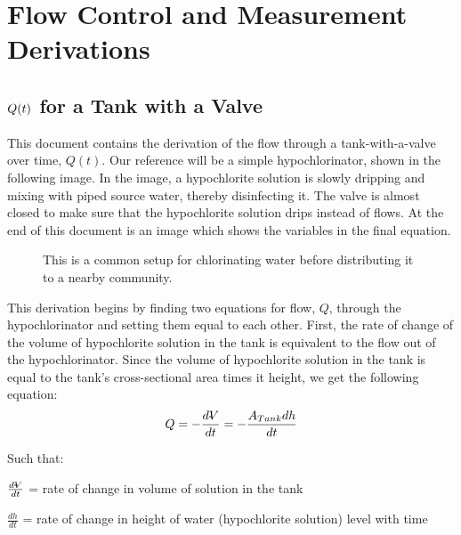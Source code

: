 \documentclass[letterpaper,10pt,english]{sphinxmanual}
\let\sphinxpxdimen\pdfpxdimen\else\newdimen\sphinxpxdimen
\begin{document}
\chapter{Flow Control and Measurement Derivations}
\label{\detokenize{Flow_Control_and_Measurement/FCM_Derivations:flow-control-and-measurement-derivations}}\label{\detokenize{Flow_Control_and_Measurement/FCM_Derivations:flow-control-derivations}}\label{\detokenize{Flow_Control_and_Measurement/FCM_Derivations::doc}}

\section{\protect\(Q(t)\protect\) for a Tank with a Valve}
\label{\detokenize{Flow_Control_and_Measurement/FCM_Derivations:for-a-tank-with-a-valve}}\label{\detokenize{Flow_Control_and_Measurement/FCM_Derivations:flow-for-a-tank-with-a-valve}}
This document contains the derivation of the flow through a tank-with-a-valve over time, \(Q(t)\). Our reference will be a simple hypochlorinator, shown in the following image. In the image, a hypochlorite solution is slowly dripping and mixing with piped source water, thereby disinfecting it. The valve is almost closed to make sure that the hypochlorite solution drips instead of flows. At the end of this document is an image which shows the variables in the final equation.

\begin{figure}[htbp]
\centering
\capstart

\noindent\sphinxincludegraphics[width=600\sphinxpxdimen]{{drip_hypochlorinator}.png}
\caption{This is a common setup for chlorinating water before distributing it to a nearby community.}\label{\detokenize{Flow_Control_and_Measurement/FCM_Derivations:id1}}\label{\detokenize{Flow_Control_and_Measurement/FCM_Derivations:drip-hypochlorinator}}\end{figure}

This derivation begins by finding two equations for flow, \(Q\), through the hypochlorinator and setting them equal to each other. First, the rate of change of the volume of hypochlorite solution in the tank is equivalent to the flow out of the hypochlorinator. Since the volume of hypochlorite solution in the tank is equal to the tank’s cross-sectional area times it height, we get the following equation:
\begin{equation}\label{equation:Flow_Control_and_Measurement/FCM_Derivations:Flow_Control_and_Measurement/FCM_Derivations:0}
\begin{split}Q =  - \frac{d\rlap{-}V}{dt} = - \frac{{A_{Tank}}dh}{dt}\end{split}
\end{equation}
\begin{DUlineblock}{0em}
\item[] Such that:
\item[] \(\frac{d\rlap{-}V}{dt}\) = rate of change in volume of solution in the tank
\item[] \(\frac{dh}{dt}\) = rate of change in height of water (hypochlorite solution) level with time
\end{DUlineblock}
\end{document}
